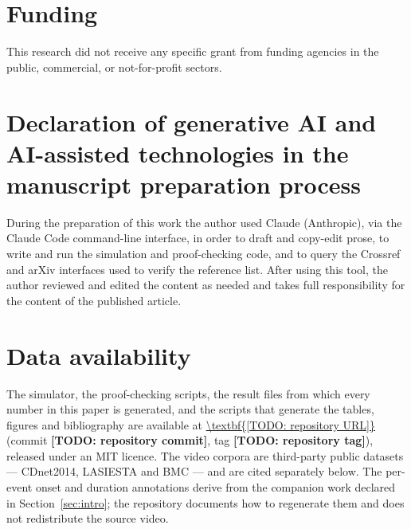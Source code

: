 \documentclass[preprint,review,12pt]{elsarticle}
\newcommand{\numRepoUrl}{\TODO{repository URL}}
\newcommand{\numRepoCommit}{\TODO{repository commit}}
\newcommand{\numRepoTag}{\TODO{repository tag}}
\newcommand{\TODO}[1]{\textbf{[TODO: #1]}}
\theoremstyle{definition}
\begin{document}
\section*{Funding}
This research did not receive any specific grant from funding agencies in the public, commercial,
or not-for-profit sectors.

\section*{Declaration of generative AI and AI-assisted technologies in the manuscript
preparation process}
During the preparation of this work the author used Claude (Anthropic), via the Claude Code
command-line interface, in order to draft and copy-edit prose, to write and run the simulation and
proof-checking code, and to query the Crossref and arXiv interfaces used to verify the reference
list. After using this tool, the author reviewed and edited the content as needed and takes full
responsibility for the content of the published article.

\section*{Data availability}
The simulator, the proof-checking scripts, the result files from which every number in this paper
is generated, and the scripts that generate the tables, figures and bibliography are available at
\expandafter\url\expandafter{\numRepoUrl} (commit \numRepoCommit, tag \numRepoTag), released
under an MIT licence. The
video corpora are third-party public datasets --- CDnet2014, LASIESTA and BMC --- and are cited
separately below. The per-event onset and duration annotations derive from the companion work
declared in Section~\ref{sec:intro}; the repository documents how to regenerate them and does not
redistribute the source video.



\end{document}
